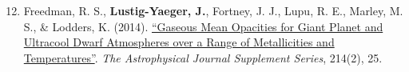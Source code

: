 \documentclass[margin,10pt]{res}
\newenvironment{benumerate}[1]{
    \let\oldItem\item
    \def\item{\addtocounter{enumi}{-2}\oldItem}
    \begin{enumerate}
    \setcounter{enumi}{#1}
    \addtocounter{enumi}{1}
}{
    \end{enumerate}
}
\begin{document}
\begin{resume}
\begin{benumerate}{11}
                    \item Freedman, R. S., \textbf{Lustig-Yaeger, J.}, Fortney, J. J., Lupu, R. E., Marley, M. S., \& Lodders, K. (2014). \href{http://adsabs.harvard.edu/abs/2014ApJS..214...25F}{``Gaseous Mean Opacities for Giant Planet and Ultracool Dwarf Atmospheres over a Range of Metallicities and Temperatures''}. \textit{The Astrophysical Journal Supplement Series}, 214(2), 25.\\
                \end{benumerate}
                 
                 

\end{resume}
\end{document}
